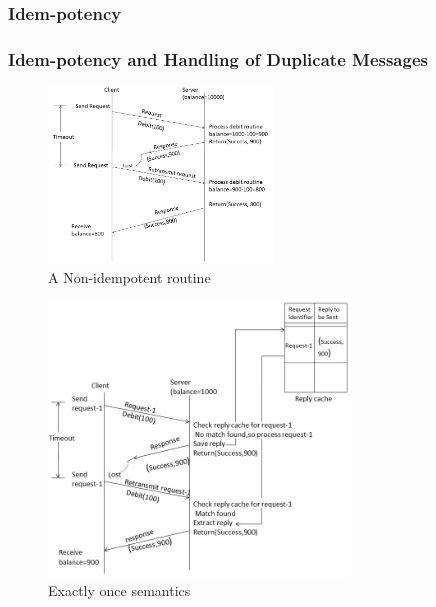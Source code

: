 \documentclass{beamer}
\begin{document}
\subsubsection{Idem-potency}
\begin{frame}[allowframebreaks]
	\frametitle{Idem-potency and Handling of Duplicate Messages}
	
	\begin{figure}
		\centering
		\includegraphics[width=6cm]{fig311.jpg}
		\caption{A Non-idempotent routine}
	\end{figure}
	\framebreak
	\begin{figure}
		\centering
		\includegraphics[width=8cm]{fig312.jpg}
		\caption{Exactly once semantics}
	\end{figure}
\end{frame}
\end{document}

